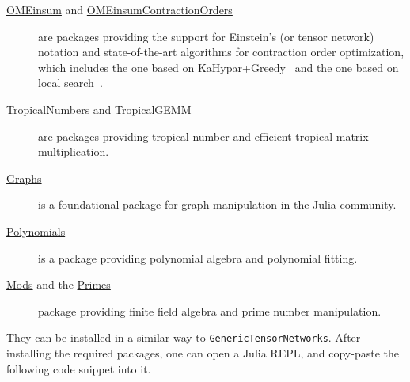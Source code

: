 \documentclass[onefignum, onetabnum]{siamart190516}
\newcommand{\<}{\langle}
\renewcommand{\>}{\rangle}
\begin{document}
\begin{description}
	\item[\href{https://github.com/under-Peter/OMEinsum.jl}{OMEinsum} and \href{https://github.com/QuEraComputing/OMEinsumContractionOrders.jl}{OMEinsumContractionOrders}] are packages providing the support for Einstein's (or tensor network) notation and state-of-the-art algorithms for contraction order optimization, which includes the one based on KaHypar+Greedy~\cite{Gray2021, Pan2021} and the one based on local search~\cite{Kalachev2021}.
	\item[\href{https://github.com/TensorBFS/TropicalNumbers.jl}{TropicalNumbers} and \href{https://github.com/TensorBFS/TropicalGEMM.jl}{TropicalGEMM}] are packages providing tropical number and efficient tropical matrix multiplication.
	\item[\href{https://github.com/JuliaGraphs/Graphs.jl}{Graphs}] is a foundational package for graph manipulation in the Julia community.
	\item[\href{https://github.com/JuliaMath/Polynomials.jl}{Polynomials}] is a package providing polynomial algebra and polynomial fitting.
	\item[\href{https://github.com/scheinerman/Mods.jl}{Mods} and the \href{https://github.com/JuliaMath/Primes.jl}{Primes}] package providing finite field algebra and prime number manipulation.
\end{description}

They can be installed in a similar way to \texttt{GenericTensorNetworks}.
After installing the required packages, one can open a Julia REPL, and copy-paste the following code snippet into it.


\end{document}
